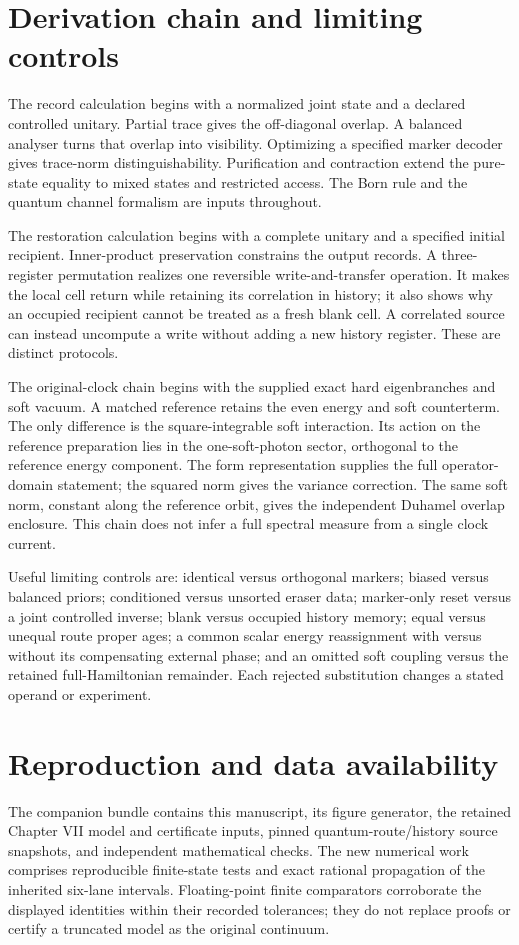 \appendix
\section{Derivation chain and limiting controls}
The record calculation begins with a normalized joint state and a declared controlled unitary. Partial trace gives the off-diagonal overlap. A balanced analyser turns that overlap into visibility. Optimizing a specified marker decoder gives trace-norm distinguishability. Purification and contraction extend the pure-state equality to mixed states and restricted access. The Born rule and the quantum channel formalism are inputs throughout.

The restoration calculation begins with a complete unitary and a specified initial recipient. Inner-product preservation constrains the output records. A three-register permutation realizes one reversible write-and-transfer operation. It makes the local cell return while retaining its correlation in history; it also shows why an occupied recipient cannot be treated as a fresh blank cell. A correlated source can instead uncompute a write without adding a new history register. These are distinct protocols.

The original-clock chain begins with the supplied exact hard eigenbranches and soft vacuum. A matched reference retains the even energy and soft counterterm. The only difference is the square-integrable soft interaction. Its action on the reference preparation lies in the one-soft-photon sector, orthogonal to the reference energy component. The form representation supplies the full operator-domain statement; the squared norm gives the variance correction. The same soft norm, constant along the reference orbit, gives the independent Duhamel overlap enclosure. This chain does not infer a full spectral measure from a single clock current.

Useful limiting controls are: identical versus orthogonal markers; biased versus balanced priors; conditioned versus unsorted eraser data; marker-only reset versus a joint controlled inverse; blank versus occupied history memory; equal versus unequal route proper ages; a common scalar energy reassignment with versus without its compensating external phase; and an omitted soft coupling versus the retained full-Hamiltonian remainder. Each rejected substitution changes a stated operand or experiment.

\section{Reproduction and data availability}
The companion bundle contains this manuscript, its figure generator, the retained Chapter VII model and certificate inputs, pinned quantum-route/history source snapshots, and independent mathematical checks. The new numerical work comprises reproducible finite-state tests and exact rational propagation of the inherited six-lane intervals. Floating-point finite comparators corroborate the displayed identities within their recorded tolerances; they do not replace proofs or certify a truncated model as the original continuum.

